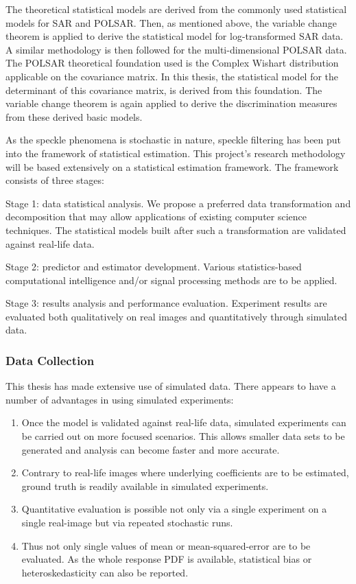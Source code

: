 The theoretical statistical models are derived from the commonly used statistical models for SAR and POLSAR.
Then, as mentioned above, the variable change theorem is applied to derive the statistical model for log-transformed SAR data.
A similar methodology is then followed for the multi-dimensional POLSAR data.
The POLSAR theoretical foundation used is the Complex Wishart distribution applicable on the covariance matrix.
In this thesis, the statistical model for the determinant of this covariance matrix,
  is derived from this foundation.
The variable change theorem is again applied to derive the discrimination measures from these derived basic models.
  
As the speckle phenomena is stochastic in nature, speckle filtering has been put into the framework of statistical estimation.
This project's research methodology will be based extensively on a statistical estimation framework. 
The framework consists of three stages:

\begin{description}
\item{Stage 1:} data statistical analysis. 
We propose a preferred data transformation and decomposition that may allow applications of existing computer science techniques. 
The statistical models built after such a transformation are validated against real-life data.
\item{Stage 2:} predictor and estimator development.
Various statistics-based computational intelligence and/or signal processing methods are to be applied. 
\item{Stage 3:} results analysis and performance evaluation.
Experiment results are evaluated both qualitatively on real images and quantitatively through simulated data. 
\end{description}

\subsubsection{Data Collection}

This thesis has made extensive use of simulated data. 
There appears to have a number of advantages in using simulated experiments:
\begin{enumerate}
\item Once the model is validated against real-life data, simulated experiments can be carried out on more focused scenarios.
This allows smaller data sets to be generated and analysis can become faster and more accurate.
\item Contrary to real-life images where underlying coefficients are to be estimated, ground truth is readily available in simulated experiments.
\item Quantitative evaluation is possible not only via a single experiment on a single real-image but via repeated stochastic runs. 
\item Thus not only single values of mean or mean-squared-error are to be evaluated. 
As the whole response PDF is available, statistical bias or heteroskedasticity can also be reported.
\end{enumerate}

